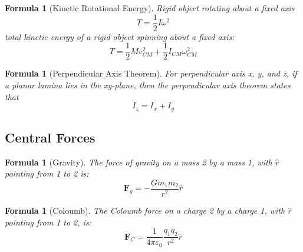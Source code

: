 \documentclass[12pt]{article}
\newtheorem{for}[thm]{Formula}
\theoremstyle{definition}
\theoremstyle{remark}
\numberwithin{equation}{section}
\newcommand\B[1]{\textbf{#1}}
\begin{document}
\vspace{15pt}

\begin{for}[Kinetic Rotational Energy]
        Rigid object rotating about a fixed axis\begin{equation}
                T = \frac{1}{2}I\omega^2
        \end{equation}
        total kinetic energy of a rigid object spinning about a fixed axis: \begin{equation}
                T = \frac{1}{2}Mv_{CM}^2 + \frac{1}{2}I_{CM}\omega_{CM}^2
        \end{equation}
\end{for}

\vspace{15pt}

\begin{for}[Perpendicular Axis Theorem]
        For perpendicular axis x, y, and z, if a planar lamina lies in the xy-plane, then the perpendicular axis theorem states that \begin{equation}
                I_z = I_x + I_y
        \end{equation}
\end{for}


\vspace{15pt}

\subsection{Central Forces}

\begin{for}[Gravity]
        The force of gravity on a mass 2 by a mass 1, with $\hat{r}$ pointing from 1 to 2 is:
        \begin{equation}
                \B{F}_g = -\frac{Gm_1m_2}{r^2}\hat{r}
        \end{equation}
\end{for}


\vspace{15pt}


\begin{for}[Coloumb]
        The Coloumb force on a charge 2 by a charge 1, with $\hat{r}$ pointing from 1 to 2, is:
        \begin{equation}
                \B{F}_C = \frac{1}{4\pi \varepsilon_0}\frac{q_1q_2}{r^2}\hat{r}
        \end{equation}
\end{for}
\end{document}
